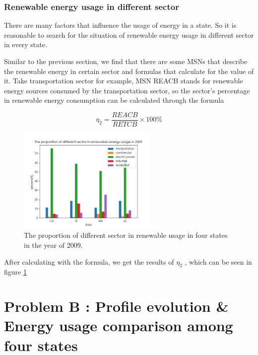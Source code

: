 \documentclass[a4paper,11pt]{article}
\begin{document}
\subsubsection{Renewable energy usage in different sector}
\par There are many factors that influence the usage of energy in a state. So it is reasonable to search for the situation of renewable energy usage in different sector in every state.
\par Similar to the previous section, we find that there are some MSNs that describe the renewable energy in certain sector and formulas that calculate for the value of it. Take transportation sector for example, MSN REACB stands for renewable energy sources consumed by the transportation sector, so the sector's percentage in renewable energy consumption can be calculated through the formula

\begin{equation}
    \eta_2=\frac{REACB}{RETCB} \times 100\%
\end{equation}

\begin{figure}[h]%
    \centering 
    \includegraphics[width=0.6\textwidth]{./Pic/1-3.png}
    \caption{The proportion of different sector in renewable usage in four states in the year of 2009.}
    \label{fig:1-3}  
\end{figure}
\par After calculating with the formula, we get the results of $\eta_2$ , which can be seen in figure \ref{fig:1-3}






\section{Problem B : Profile evolution \& Energy usage comparison among four states}
\end{document}
